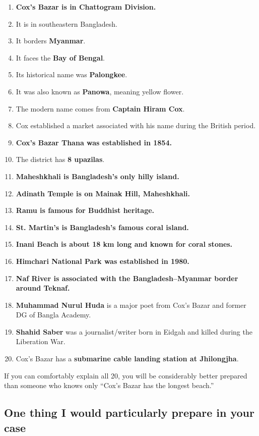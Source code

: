 \begin{enumerate}
  \item \textbf{Cox's Bazar is in Chattogram Division.}
  \item It is in southeastern Bangladesh.
  \item It borders \textbf{Myanmar}.
  \item It faces the \textbf{Bay of Bengal}.
  \item Its historical name was \textbf{Palongkee}.
  \item It was also known as \textbf{Panowa}, meaning yellow flower.
  \item The modern name comes from \textbf{Captain Hiram Cox}.
  \item Cox established a market associated with his name during the British period.
  \item \textbf{Cox's Bazar Thana was established in 1854.}
  \item The district has \textbf{8 upazilas}.
  \item \textbf{Maheshkhali is Bangladesh's only hilly island.}
  \item \textbf{Adinath Temple is on Mainak Hill, Maheshkhali.}
  \item \textbf{Ramu is famous for Buddhist heritage.}
  \item \textbf{St. Martin's is Bangladesh's famous coral island.}
  \item \textbf{Inani Beach is about 18 km long and known for coral stones.}
  \item \textbf{Himchari National Park was established in 1980.}
  \item \textbf{Naf River is associated with the Bangladesh--Myanmar border around Teknaf.}
  \item \textbf{Muhammad Nurul Huda} is a major poet from Cox's Bazar and former DG of Bangla Academy.
  \item \textbf{Shahid Saber} was a journalist/writer born in Eidgah and killed during the Liberation War.
  \item Cox's Bazar has a \textbf{submarine cable landing station at Jhilongjha}.
\end{enumerate}

If you can comfortably explain all 20, you will be considerably better prepared than someone who knows only ``Cox's Bazar has the longest beach.''

\medskip

\subsection{One thing I would particularly prepare in your case}

